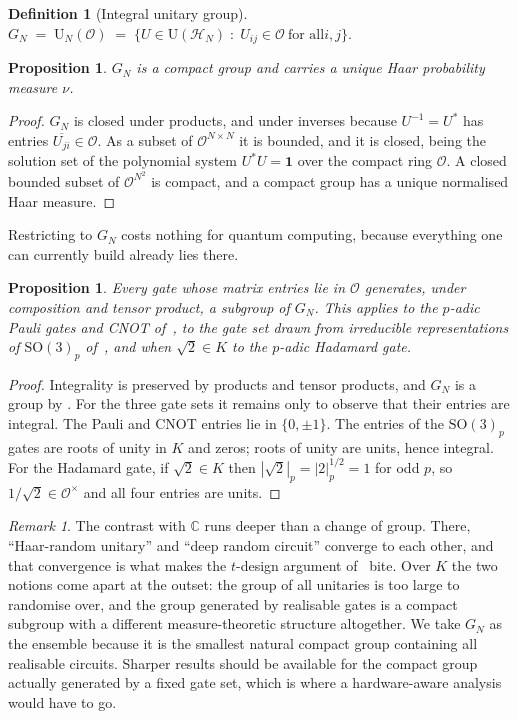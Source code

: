 \documentclass{ceurart}
\theoremstyle{plain}
\newtheorem{proposition}[theorem]{Proposition}
\theoremstyle{definition}
\newtheorem{definition}[theorem]{Definition}
\theoremstyle{remark}
\newtheorem{remark}[theorem]{Remark}
\theoremstyle{plain}
\newcommand{\padicnorm}[1]{\left|#1\right|_p}
\newcommand{\HH}{\mathcal{H}}
\newcommand{\OK}{\mathcal{O}}
\newcommand{\Id}{\mathbf{1}}
\newcommand{\Uni}{\mathrm{U}}
\begin{document}
\begin{definition}[Integral unitary group]
\label{def:integral}
$G_N \;=\; \Uni_N(\OK)\;=\;\{U\in\Uni(\HH_N)\;:\;U_{ij}\in\OK\ \text{for all
$i,j$}\}$.
\end{definition}

\begin{proposition}
\label{prop:compact}
$G_N$ is a compact group and carries a unique Haar probability measure $\nu$.
\end{proposition}

\begin{proof}
$G_N$ is closed under products, and under inverses because
$U^{-1}=U^\ast$ has entries $\overline{U_{ji}}\in\OK$. As a subset of
$\OK^{N\times N}$ it is bounded, and it is closed, being the solution set of
the polynomial system $U^\ast U=\Id$ over the compact ring $\OK$. A closed
bounded subset of $\OK^{N^2}$ is compact, and a compact group has a unique
normalised Haar measure.
\end{proof}

Restricting to $G_N$ costs nothing for quantum computing, because everything
one can currently build already lies there.

\begin{proposition}
\label{prop:gates}
Every gate whose matrix entries lie in $\OK$ generates, under composition and
tensor product, a subgroup of $G_N$. This applies to the $p$-adic Pauli gates
and CNOT of~\cite{AMP23}, to the gate set drawn from irreducible
representations of $\mathrm{SO}(3)_p$ of~\cite{SLMW26gates}, and  when
$\sqrt2\in K$  to the $p$-adic Hadamard gate.
\end{proposition}

\begin{proof}
Integrality is preserved by products and tensor products, and $G_N$ is a group
by . For the three gate sets it remains only to observe that
their entries are integral. The Pauli and CNOT entries lie in $\{0,\pm1\}$. The
entries of the $\mathrm{SO}(3)_p$ gates are roots of unity in $K$ and zeros;
roots of unity are units, hence integral. For the Hadamard gate, if
$\sqrt2\in K$ then $\padicnorm{\sqrt 2}=\padicnorm 2^{1/2}=1$ for odd $p$, so
$1/\sqrt2\in\OK^\times$ and all four entries are units.
\end{proof}

\begin{remark}
\label{rem:ensemble}
The contrast with $\mathbb{C}$ runs deeper than a change of group. There,
``Haar-random unitary'' and ``deep random circuit'' converge to each other, and
that convergence is what makes the $t$-design argument of~\cite{Mc18} bite.
Over $K$ the two notions come apart at the outset: the group of all unitaries
is too large to randomise over, and the group generated by realisable gates is
a compact subgroup with a different measure-theoretic structure altogether. We
take $G_N$ as the ensemble because it is the smallest natural compact group
containing all realisable circuits. Sharper results should be available for the
compact group actually generated by a fixed gate set, which is where a
hardware-aware analysis would have to go.
\end{remark}
\end{document}
